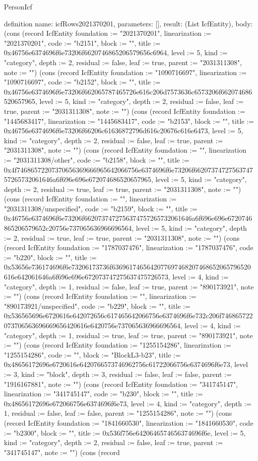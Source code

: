 \begin{lexlean}{PersonIcf}
\begin{semanticmodule}
definition{
  name: icfRows2021370201,
  parameters: [],
  result: (List IcfEntity),
  body: (cons (record IcfEntity {foundation := "2021370201", linearization := "2021370201", code := "b2151", block := "", title := 0x46756e6374696f6e73206f6620746865206579656c6964, level := 5, kind := "category", depth := 2, residual := false, leaf := true, parent := "2031311308", note := ""}) (cons (record IcfEntity {foundation := "1090716697", linearization := "1090716697", code := "b2152", block := "", title := 0x46756e6374696f6e73206f662065787465726e616c206d7573636c6573206f662074686520657965, level := 5, kind := "category", depth := 2, residual := false, leaf := true, parent := "2031311308", note := ""}) (cons (record IcfEntity {foundation := "1445683417", linearization := "1445683417", code := "b2153", block := "", title := 0x46756e6374696f6e73206f66206c61636872796d616c20676c616e6473, level := 5, kind := "category", depth := 2, residual := false, leaf := true, parent := "2031311308", note := ""}) (cons (record IcfEntity {foundation := "", linearization := "2031311308/other", code := "b2158", block := "", title := 0x4f74686572207370656369666965642066756e6374696f6e73206f6620737472756374757265732061646a6f696e696e672074686520657965, level := 5, kind := "category", depth := 2, residual := true, leaf := true, parent := "2031311308", note := ""}) (cons (record IcfEntity {foundation := "", linearization := "2031311308/unspecified", code := "b2159", block := "", title := 0x46756e6374696f6e73206f6620737472756374757265732061646a6f696e696e6720746865206579652c20756e737065636966696564, level := 5, kind := "category", depth := 2, residual := true, leaf := true, parent := "2031311308", note := ""}) (cons (record IcfEntity {foundation := "1787037476", linearization := "1787037476", code := "b220", block := "", title := 0x53656e736174696f6e73206173736f6369617465642077697468207468652065796520616e642061646a6f696e696e672073747275637475726573, level := 4, kind := "category", depth := 1, residual := false, leaf := true, parent := "890173921", note := ""}) (cons (record IcfEntity {foundation := "", linearization := "890173921/unspecified", code := "b229", block := "", title := 0x536565696e6720616e642072656c617465642066756e6374696f6e732c206f746865722073706563696669656420616e6420756e737065636966696564, level := 4, kind := "category", depth := 1, residual := true, leaf := true, parent := "890173921", note := ""}) (cons (record IcfEntity {foundation := "1255154286", linearization := "1255154286", code := "", block := "BlockL3-b23", title := 0x48656172696e6720616e6420766573746962756c61722066756e6374696f6e73, level := 3, kind := "block", depth := 3, residual := false, leaf := false, parent := "1916167881", note := ""}) (cons (record IcfEntity {foundation := "341745147", linearization := "341745147", code := "b230", block := "", title := 0x48656172696e672066756e6374696f6e73, level := 4, kind := "category", depth := 1, residual := false, leaf := false, parent := "1255154286", note := ""}) (cons (record IcfEntity {foundation := "1841660530", linearization := "1841660530", code := "b2300", block := "", title := 0x536f756e6420646574656374696f6e, level := 5, kind := "category", depth := 2, residual := false, leaf := true, parent := "341745147", note := ""}) (cons (record }
\end{semanticmodule}
\end{lexlean}
